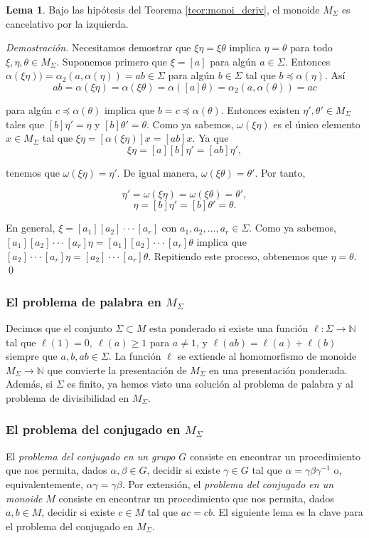 \documentclass[12pt]{article}
\theoremstyle{definition}
\newtheorem{lema}{Lema}[section]
\begin{document}
\begin{lema}
Bajo las hipótesis del Teorema \ref{teor:monoi_deriv}, el monoide $M_\Sigma$ es cancelativo por la izquierda.
\label{lema:cancel}
\end{lema}

\textit{Demostración.} Necesitamos demostrar que $\xi\eta=\xi\theta$ implica $\eta=\theta$ para todo $\xi,\eta,\theta\in M_\Sigma$. Suponemos primero que $\xi=[a]$ para algún $a\in\Sigma$. Entonces $\alpha(\xi\eta))=\alpha_2(a,\alpha(\eta))=ab\in\Sigma$ para algún $b\in\Sigma$ tal que $b\preceq \alpha(\eta)$. Así
$$ab=\alpha(\xi\eta)=\alpha(\xi\theta)=\alpha([a]\theta)=\alpha_2(a,\alpha(\theta))=ac$$

para algún $c\preceq\alpha(\theta)$ implica que $b=c\preceq\alpha(\theta)$. Entonces existen $\eta',\theta'\in M_\Sigma$ tales que $[b]\eta'=\eta$ y $[b]\theta'=\theta$. Como ya sabemos, $\omega(\xi\eta)$ es el único elemento $x\in M_\Sigma$ tal que $\xi\eta=[\alpha(\xi\eta)]x=[ab]x$. Ya que
$$\xi\eta=[a][b]\eta'=[ab]\eta',$$

tenemos que $\omega(\xi\eta) = \eta'$. De igual manera, $\omega(\xi\theta)=\theta'$. Por tanto,

$$\eta'=\omega(\xi\eta)=\omega(\xi\theta)=\theta',$$
$$\eta=[b]\eta'=[b]\theta'=\theta.$$

En general, $\xi=[a_1][a_2]\cdot\cdot\cdot[a_r]$ con $a_1,a_2,...,a_r\in\Sigma$. Como ya sabemos, $[a_1][a_2]\cdot\cdot\cdot[a_r]\eta=[a_1][a_2]\cdot\cdot\cdot[a_r]\theta$ implica que $[a_2]\cdot\cdot\cdot[a_r]\eta=[a_2]\cdot\cdot\cdot[a_r]\theta$. Repitiendo este proceso, obtenemos que $\eta=\theta$. \qed

\subsubsection{El problema de palabra en $M_\Sigma$}

Decimos que el conjunto $\Sigma\subset M$ esta ponderado si existe una función $\ell:\Sigma\rightarrow\mathbb{N}$ tal que $\ell(1)=0,\ \ell(a)\geq 1$ para $a\neq 1$, y $\ell(ab)=\ell(a)+\ell(b)$ siempre que $a,b,ab\in\Sigma$. La función $\ell$ se extiende al homomorfismo de monoide $M_\Sigma\rightarrow\mathbb{N}$ que convierte la presentación de $M_\Sigma$ en una presentación ponderada. Además, si $\Sigma$ es finito, ya hemos visto una solución al problema de palabra y al problema de divisibilidad en $M_\Sigma$.

\subsubsection{El problema del conjugado en $M_\Sigma$}
El \textit{problema del conjugado en un grupo} $G$ consiste en encontrar un procedimiento que nos permita, dados $\alpha,\beta\in G$, decidir si existe $\gamma\in G$ tal que $\alpha=\gamma\beta\gamma^{-1}$ o, equivalentemente, $\alpha\gamma=\gamma\beta$. Por extensión, el \textit{problema del conjugado en un monoide} $M$ consiste en encontrar un procedimiento que nos permita, dados $a,b\in M$, decidir si existe $c\in M$ tal que $ac=cb$. El siguiente lema es la clave para el problema del conjugado en $M_\Sigma$.
\end{document}
